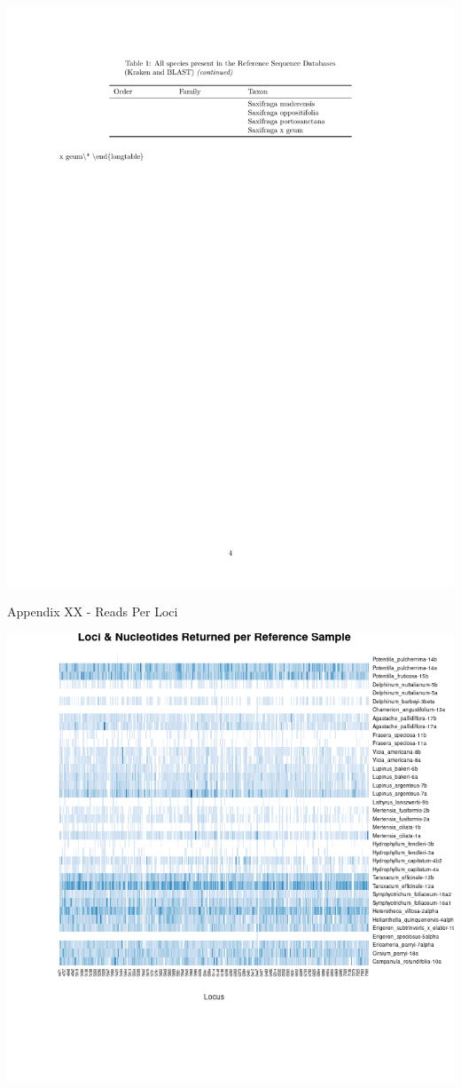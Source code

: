 \documentclass[
]{article}
\begin{document}
\includegraphics{../graphics/assorted/kraken_db_spp_table-4.pdf}

\newpage

Appendix XX - Reads Per Loci

\includegraphics[width=0.98\linewidth]{../graphics/plots/Loci_Reference_Samples}
\end{document}
